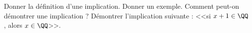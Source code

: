 %
%
	\begin{tasks}
		\task Donner la définition d'une implication.
		\task Donner un exemple.
		\task Comment peut-on démontrer une implication ?
		\task Démontrer l'implication suivante : <<si $x+1 \in \QQ$, alors $x \in \QQ$>>.
	\end{tasks}
